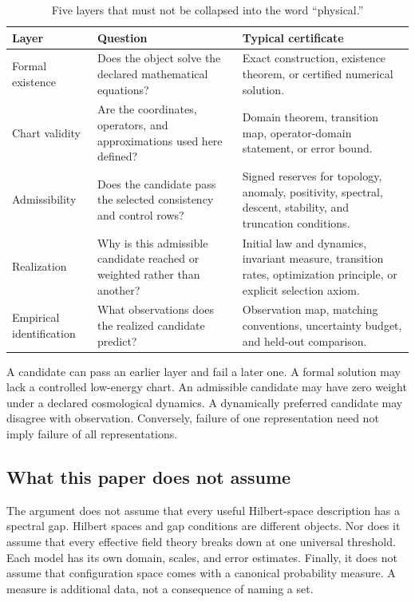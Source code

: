 \documentclass[11pt]{article}
\theoremstyle{definition}
\theoremstyle{remark}
\newcommand{\1}{\mathbf 1}
\begin{document}
\begin{table}[htbp]
\centering
\small
\begin{tabularx}{\textwidth}{L{0.18\textwidth}YY}
\toprule
Layer & Question & Typical certificate \\
\midrule
Formal existence
& Does the object solve the declared mathematical equations?
& Exact construction, existence theorem, or certified numerical solution. \\
Chart validity
& Are the coordinates, operators, and approximations used here defined?
& Domain theorem, transition map, operator-domain statement, or error bound. \\
Admissibility
& Does the candidate pass the selected consistency and control rows?
& Signed reserves for topology, anomaly, positivity, spectral, descent,
  stability, and truncation conditions. \\
Realization
& Why is this admissible candidate reached or weighted rather than another?
& Initial law and dynamics, invariant measure, transition rates,
  optimization principle, or explicit selection axiom. \\
Empirical identification
& What observations does the realized candidate predict?
& Observation map, matching conventions, uncertainty budget, and
  held-out comparison. \\
\bottomrule
\end{tabularx}
\caption{Five layers that must not be collapsed into the word
``physical.''}
\label{tab:layers}
\end{table}

A candidate can pass an earlier layer and fail a later one.  A formal
solution may lack a controlled low-energy chart.  An admissible candidate
may have zero weight under a declared cosmological dynamics.  A dynamically
preferred candidate may disagree with observation.  Conversely, failure of
one representation need not imply failure of all representations.

\subsection{What this paper does not assume}

The argument does not assume that every useful Hilbert-space description
has a spectral gap.  Hilbert spaces and gap conditions are different
objects.  Nor does it assume that every effective field theory breaks down
at one universal threshold.  Each model has its own domain, scales, and
error estimates.  Finally, it does not assume that configuration space
comes with a canonical probability measure.  A measure is additional data,
not a consequence of naming a set.
\end{document}
